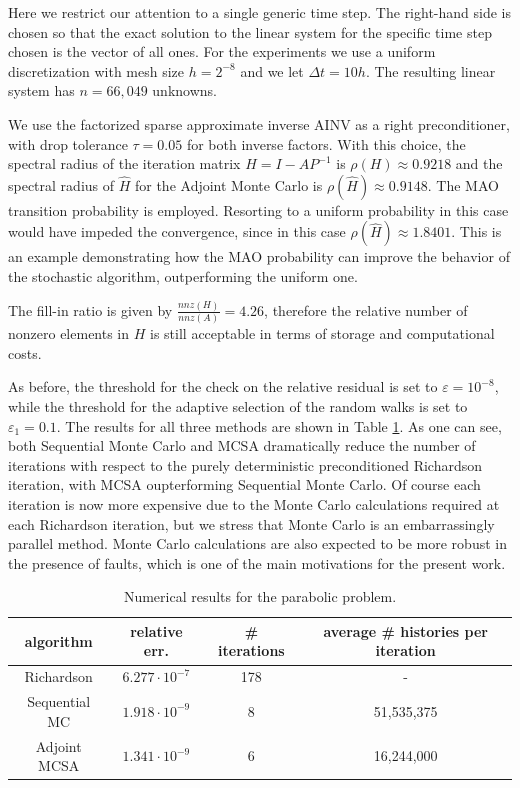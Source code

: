 \documentclass[times]{nlaauth}
\begin{document}
Here we restrict our attention to a single generic time step.
The right-hand side is chosen so that the exact
solution to the linear system for the specific time step chosen is
the vector of all ones. For the experiments we use a uniform discretization
with mesh size $h=2^{-8}$ and we let $\Delta t = 10h$.
The resulting linear system has $n=66,049$ unknowns.

We use the factorized
sparse approximate inverse AINV \cite{BT1998} as a right preconditioner,
with drop tolerance $\tau = 0.05$ for both inverse factors.
With this choice,
the spectral radius of the iteration matrix $H=I-AP^{-1}$ is $\rho(H)\approx
0.9218$ and the spectral radius of $\hat{H}$ for the Adjoint Monte Carlo is
$\rho(\hat{H})\approx 0.9148$. The MAO transition probability is employed.
 Resorting to a uniform probability in this case would have impeded
the
convergence, since in this case $\rho(\hat{H})\approx 1.8401$.
This is an example demonstrating how the MAO probability can
improve the behavior of the stochastic algorithm, outperforming the
uniform one.

The fill-in ratio is given by $\frac{nnz(H)}{nnz(A)}=4.26$,
therefore the relative number of nonzero elements in $H$ is still acceptable
in terms of storage and computational costs.

As before,
the threshold for the check on the relative residual is set to $\varepsilon
=10^{-8}$, while the threshold
for the adaptive selection of the random walks is set
to $\varepsilon_1=0.1$.
The results for all three methods are shown in Table \ref{parabolic_results}. As
one can see, both Sequential Monte Carlo and MCSA
dramatically reduce the number of iterations with
respect to the purely deterministic
 preconditioned Richardson iteration, with MCSA oupterforming
Sequential Monte Carlo.
Of course each iteration is now more expensive due to the Monte Carlo
calculations required at each Richardson iteration, but we stress
that Monte Carlo is an embarrassingly parallel method.
Monte Carlo calculations are also expected to be more robust in the
presence of faults, which is one of the main motivations for the
present work.

\begin{table}[!t]
\centering
\hspace*{-0.8cm}
\begin{tabular}{|c|c|c|c|}
\hline
algorithm & relative err.& \# iterations & average \# histories per iteration\\
\hline
 Richardson & $6.277\cdot 10^{-7}$ & 178 & - \\
 \hline
 Sequential MC & $1.918 \cdot 10^{-9}$ & 8 & 51,535,375\\
\hline
 Adjoint MCSA & $1.341\cdot 10^{-9}$ & 6 & 16,244,000\\
\hline
\end{tabular}
\caption{Numerical results for the parabolic problem.}
\label{parabolic_results}
\end{table}
\end{document}
